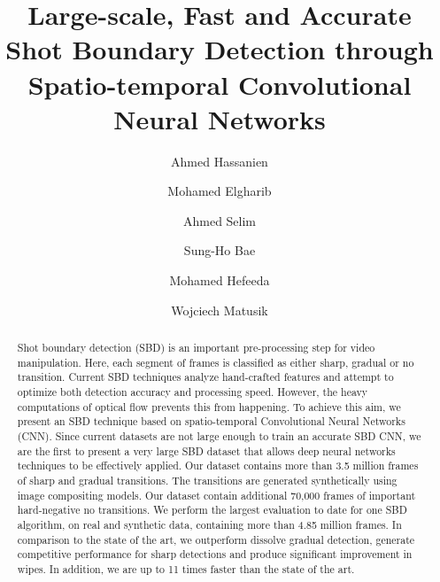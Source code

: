 \documentclass[journal]{IEEEtran}
\begin{document}
\title{Large-scale, Fast and Accurate Shot Boundary Detection through Spatio-temporal Convolutional Neural Networks}




\author[1]{Ahmed Hassanien}
\author[1]{Mohamed Elgharib}
\author[2]{Ahmed Selim}
\author[3]{Sung-Ho Bae}
\author[4]{Mohamed Hefeeda}
\author[3]{Wojciech Matusik}
    



















\maketitle

\begin{abstract}
	Shot boundary detection (SBD) is an important pre-processing step for video manipulation. Here, each segment of frames is classified as either sharp, gradual or no transition. Current SBD techniques analyze hand-crafted features and attempt to optimize both detection accuracy and processing speed. However, the heavy computations of optical flow prevents this from happening. To achieve this aim, we present an SBD technique based on spatio-temporal Convolutional Neural Networks (CNN). Since current datasets are not large enough to train an accurate SBD CNN, we are the first to present a very large SBD dataset that allows deep neural networks techniques to be effectively applied. Our dataset contains more than 3.5 million frames of sharp and gradual transitions. The transitions are generated synthetically using image compositing models. Our dataset contain additional 70,000 frames of important hard-negative no transitions. We perform the largest evaluation to date for one SBD algorithm, on real and synthetic data, containing more than 4.85 million frames. In comparison to the state of the art, we outperform dissolve gradual detection, generate competitive performance for sharp detections and produce significant improvement in wipes. In addition, we are up to 11 times faster than the state of the art.  
\end{abstract}
\end{document}
